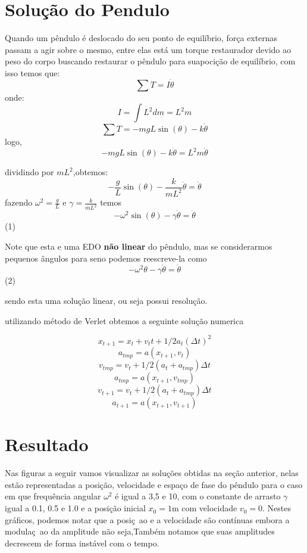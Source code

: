 \documentclass[a4paper]{article} %
\begin{document}
\section{Solu\c{c}\~ao do Pendulo}

Quando um p\^endulo \'e deslocado do seu ponto de equil\'ibrio, for\c{c}a externas passam a agir sobre o mesmo, entre elas est\'a um torque restaurador devido ao peso do corpo buscando restaurar o p\^endulo para suapoci\c{c}\~ao de equil\'ibrio, com isso temos que:
\[ \sum{T} = I\dot{\theta} \]
onde:
\[ I = \int{L^2dm} = L^2m \]
\[ \sum{T} = -mgL\sin(\theta) - k\dot{\theta} \]
logo,
\[-mgL\sin(\theta) - k\dot{\theta} = L^2m\dot{\theta}\]

dividindo por $mL^2$,obtemos:
\[-\frac{g}{L}\sin(\theta) - \frac{k}{mL^2}\dot{\theta} = \dot{\theta}\]
fazendo $\omega^2 = \frac{g}{L}$ e $\gamma = \frac{k}{mL^2}$ temos
\[-\omega^2\sin(\theta) - \gamma\dot{\theta} = \dot{\theta}\](1)

Note que esta e uma EDO \textbf{n\~ao linear} do p\^endulo, mas se considerarmos pequenos \^angulos para seno podemos reescreve-la como
\[-\omega^2\theta - \gamma\dot{\theta} = \dot{\theta}\](2)

sendo esta uma solu\c{c}\~ao linear, ou seja possui resolu\c{c}\~ao.

 utilizando m\'etodo de Verlet obtemos a seguinte solu\c{c}\~ao numerica

\[ x_{t+1} = x_t + v_tt + 1/2a_t(\Delta{t})^2 \]
\[a_{tmp} = a(x_{t+1}, v_t)\]
\[v_{tmp} = v_t + 1/2(a_t + a_{tmp})\Delta{t}\]
\[a_{tmp} = a(x_{t+1}, v_{tmp})\]
\[v_{t+1} = v_t + 1/2(a_t + a_{tmp})\Delta{t}\]
\[a_{t+1} = a(x_{t+1}, v_{t+1})\]

\section{Resultado}

Nas figuras a seguir vamos visualizar as solu\c{c}\~oes obtidas na se\c{c}\~ao anterior, nelas est\~ao representadas a posi\c{c}\~ao, velocidade e espa\c{c}o de fase do p\^endulo para o caso em que frequ\^encia angular $\omega^2$ \'e igual a 3,5 e 10, com o constante de arrasto $\gamma$ igual a 0.1, 0.5 e 1.0 e a  posi\c{c}\~ao inicial $x_0 = 1$m com velocidade $v_0 = 0$. Nestes gr\'aficos, podemos notar que a posi\c{c}~ao e a velocidade s\~ao cont\'inuas embora a modula\c{c}~ao da amplitude n\~ao seja,Tamb\'em notamos que suas amplitudes decrescem de forma inst\'avel com o tempo.
\end{document}
